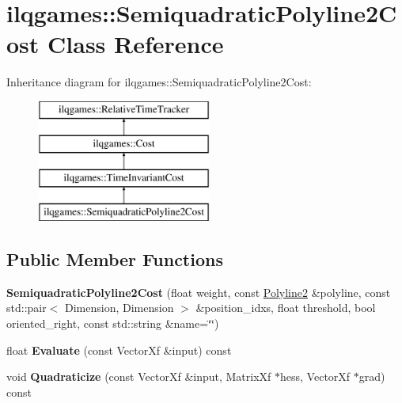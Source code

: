 \hypertarget{classilqgames_1_1_semiquadratic_polyline2_cost}{}\section{ilqgames\+:\+:Semiquadratic\+Polyline2\+Cost Class Reference}
\label{classilqgames_1_1_semiquadratic_polyline2_cost}
Inheritance diagram for ilqgames\+:\+:Semiquadratic\+Polyline2\+Cost\+:\begin{figure}[H]
\begin{center}
\leavevmode
\includegraphics[height=4.000000cm]{classilqgames_1_1_semiquadratic_polyline2_cost}
\end{center}
\end{figure}
\subsection*{Public Member Functions}
\begin{DoxyCompactItemize}
\item 
{\bfseries Semiquadratic\+Polyline2\+Cost} (float weight, const \hyperlink{classilqgames_1_1_polyline2}{Polyline2} \&polyline, const std\+::pair$<$ Dimension, Dimension $>$ \&position\+\_\+idxs, float threshold, bool oriented\+\_\+right, const std\+::string \&name=\char`\"{}\char`\"{})\hypertarget{classilqgames_1_1_semiquadratic_polyline2_cost_a7e928410aef0e930024890fb519b1290}{}\label{classilqgames_1_1_semiquadratic_polyline2_cost_a7e928410aef0e930024890fb519b1290}

\item 
float {\bfseries Evaluate} (const Vector\+Xf \&input) const \hypertarget{classilqgames_1_1_semiquadratic_polyline2_cost_abe1063a923c02e53e3512b4de85539b8}{}\label{classilqgames_1_1_semiquadratic_polyline2_cost_abe1063a923c02e53e3512b4de85539b8}

\item 
void {\bfseries Quadraticize} (const Vector\+Xf \&input, Matrix\+Xf $\ast$hess, Vector\+Xf $\ast$grad) const \hypertarget{classilqgames_1_1_semiquadratic_polyline2_cost_a74b1ce98fe98f50560f21751a7c855f2}{}\label{classilqgames_1_1_semiquadratic_polyline2_cost_a74b1ce98fe98f50560f21751a7c855f2}

\end{DoxyCompactItemize}
